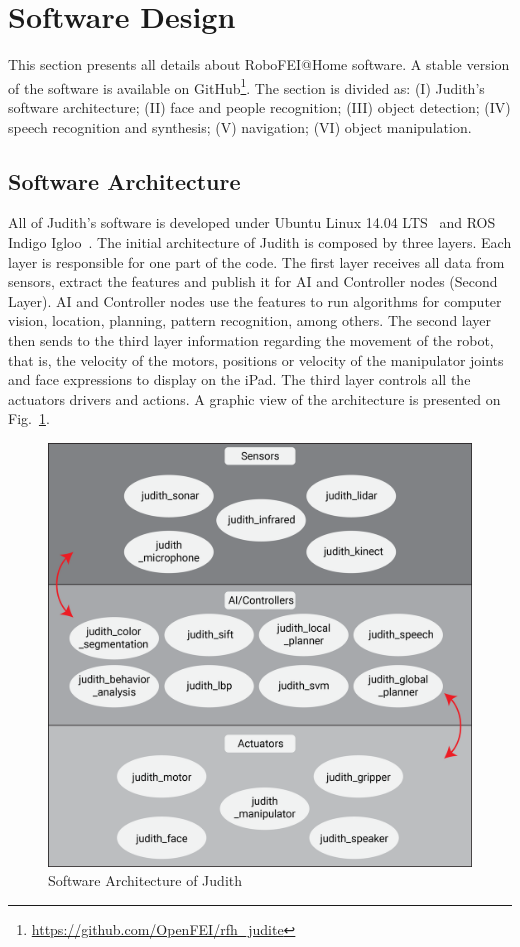 \section{Software Design}

This section presents all details about RoboFEI@Home software. A stable version of the software is available on GitHub\footnote{\url{https://github.com/OpenFEI/rfh\_judite}}. The section is divided as: (I) Judith's software architecture; (II) face and people recognition; (III) object detection; (IV) speech recognition and synthesis; (V) navigation; (VI) object manipulation.

\subsection{Software Architecture}\label{architecture}
All of Judith's software is developed under Ubuntu Linux 14.04 LTS~\cite{sobell:2014} and ROS Indigo Igloo~\cite{ros:2015}. The initial architecture of Judith is composed by three layers. Each layer is responsible for one part of the code. The first layer receives all data from sensors, extract the features and publish it for AI and Controller nodes (Second Layer). AI and Controller nodes use the features to run algorithms for computer vision, location, planning, pattern recognition, among others. The second layer then sends to the third layer information regarding the movement of the robot, that is, the velocity of the motors, positions or velocity of the manipulator joints and face expressions to display on the iPad. The third layer controls all the actuators drivers and actions. A graphic view of the architecture is presented on Fig.~\ref{fig:architecture}.

\begin{figure}[ht!]
    \centering
    \includegraphics[width = \textwidth]{figures/architecture.png}
    \caption{Software Architecture of Judith}
    \label{fig:architecture}
\end{figure}

